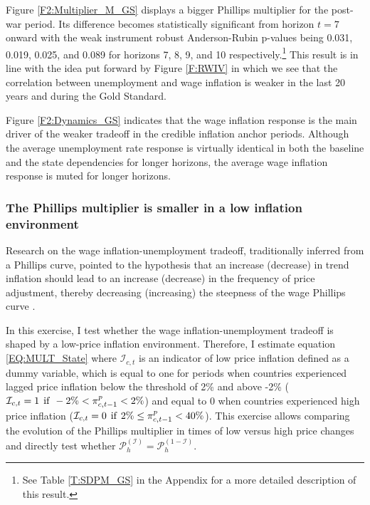 \documentclass[12pt]{article}
\begin{document}
Figure \ref{F2:Multiplier_M_GS} displays a bigger Phillips multiplier for the post-war period. Its difference becomes statistically significant from horizon $t=7$ onward with the weak instrument robust Anderson-Rubin p-values being 0.031, 0.019, 0.025, and 0.089 for horizons 7, 8, 9, and 10 respectively.\footnote{See Table \ref{T:SDPM_GS} in the Appendix for a more detailed description of this result.} This result is in line with the idea put forward by Figure \ref{F:RWIV} in which we see that the correlation between unemployment and wage inflation is weaker in the last 20 years and during the Gold Standard.

Figure \ref{F2:Dynamics_GS} indicates that the wage inflation response is the main driver of the weaker tradeoff in the credible inflation anchor periods. Although the average unemployment rate response is virtually identical in both the baseline and the state dependencies for longer horizons, the average wage inflation response is muted for longer horizons.

\subsubsection{The Phillips multiplier is smaller in a low inflation environment}

Research on the wage inflation-unemployment tradeoff, traditionally inferred from a Phillips curve, pointed to the hypothesis that  an increase (decrease) in trend inflation should lead to an increase (decrease) in the frequency of price adjustment, thereby decreasing (increasing) the steepness of the wage Phillips curve \citep{Benati2007}.

In this exercise, I test whether the wage inflation-unemployment tradeoff is shaped by a low-price inflation environment. Therefore, I estimate equation \ref{EQ:MULT_State} where $\mathcal{I}_{c,t}$ is an indicator of low price inflation defined as a dummy variable, which is equal to one for periods when countries experienced lagged price inflation below the threshold of 2\% and above -2\% ($\mathcal{I}_{c,t} = 1 \hspace{1ex} \text{if} \hspace{1ex} -2\% < \pi^p_{c,t-1} < 2\%$) and equal to 0 when countries experienced high price inflation ($\mathcal{I}_{c,t} = 0 \hspace{1ex} \text{if} \hspace{1ex} 2\% \leq \pi^p_{c,t-1} < 40\%$). This exercise allows comparing the evolution of the Phillips multiplier in times of low versus high price changes and directly test whether $\mathcal{P}_h^{(\mathcal{I})} = \mathcal{P}_h^{(1-\mathcal{I})}$.
\end{document}
